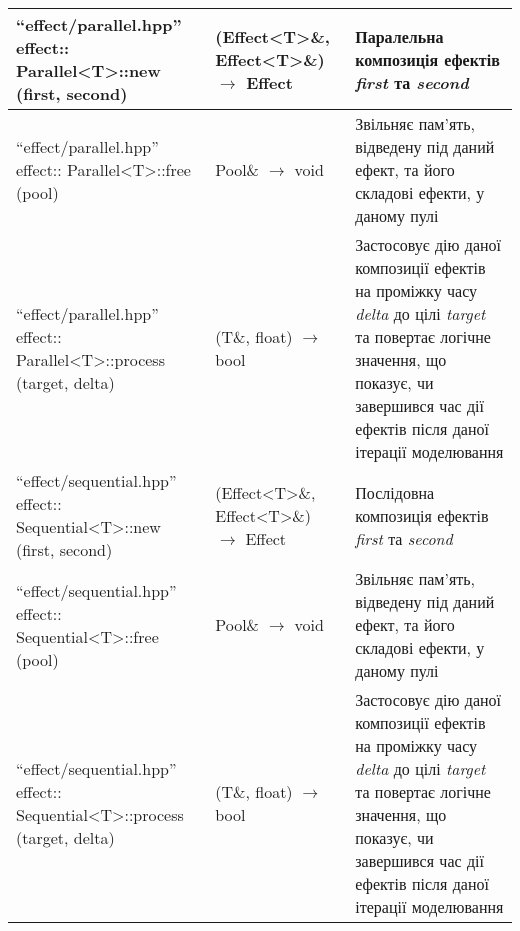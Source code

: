 {\begin{longtable}{| C{6cm} | C{4cm} | C{5cm} |}
    \hline
    ``effect/parallel.hpp'' \newline effect:: \newline
    Parallel<T>::new \newline (first, second)
    & (Effect<T>\&, Effect<T>\&) $\to$ Effect
    & Паралельна композиція ефектів \emph{first} та \emph{second} \\
    \hline
    ``effect/parallel.hpp'' \newline effect:: \newline
    Parallel<T>::free \newline (pool)
    & Pool\& $\to$ void
    & Звільняє пам'ять, відведену під даний ефект, та його складові ефекти, у даному пулі \\
    \hline
    ``effect/parallel.hpp'' \newline effect:: \newline Parallel<T>::process \newline (target, delta)
    & (T\&, float) $\to$ bool
    & Застосовує дію даної композиції ефектів на проміжку часу \emph{delta}
    до цілі \emph{target} та повертає логічне значення, що показує,
    чи завершився час дії ефектів після даної ітерації моделювання \\

    \hline
    ``effect/sequential.hpp'' \newline effect:: \newline
    Sequential<T>::new \newline (first, second)
    & (Effect<T>\&, Effect<T>\&) $\to$ Effect
    & Послідовна композиція ефектів \emph{first} та \emph{second} \\
    \hline
    ``effect/sequential.hpp'' \newline effect:: \newline
    Sequential<T>::free \newline (pool)
    & Pool\& $\to$ void
    & Звільняє пам'ять, відведену під даний ефект, та його складові ефекти, у даному пулі \\
    \hline
    ``effect/sequential.hpp'' \newline effect:: \newline Sequential<T>::process \newline (target, delta)
    & (T\&, float) $\to$ bool
    & Застосовує дію даної композиції ефектів на проміжку часу \emph{delta}
    до цілі \emph{target} та повертає логічне значення, що показує,
    чи завершився час дії ефектів після даної ітерації моделювання \\


\end{longtable}}
